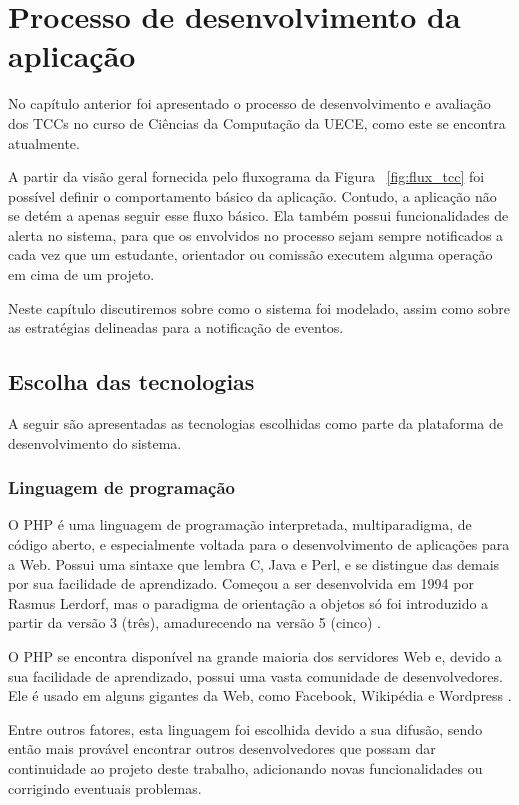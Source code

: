 \chapter{Processo de desenvolvimento da aplicação}
\label{cha:desenvolvimento}

No capítulo anterior foi apresentado o processo de desenvolvimento
e avaliação dos TCCs no curso de Ciências da Computação da UECE, como este se 
encontra atualmente. 

A partir da visão geral fornecida pelo fluxograma 
da Figura ~\ref{fig:flux_tcc} foi possível definir o comportamento básico 
da aplicação. Contudo, a aplicação não se 
detém a apenas seguir esse fluxo básico. Ela também possui funcionalidades
de alerta no sistema, para que os envolvidos no processo sejam sempre 
notificados a cada vez que um estudante, orientador ou comissão executem alguma
operação em cima de um projeto.

Neste capítulo discutiremos sobre como o sistema foi modelado, assim como sobre as
estratégias delineadas para a notificação de eventos.

\section{Escolha das tecnologias}
A seguir são apresentadas as tecnologias escolhidas como parte da plataforma de 
desenvolvimento do sistema.

\label{tecnologias}
\subsection{Linguagem de programação}
O PHP é uma linguagem de programação interpretada, multiparadigma, de código aberto, e especialmente
voltada para o desenvolvimento de aplicações para a Web. Possui uma sintaxe que lembra
C, Java e Perl, e se distingue das demais por sua facilidade de aprendizado.
Começou a ser desenvolvida em 1994 por Rasmus Lerdorf, mas o paradigma de orientação
a objetos só foi introduzido a partir da versão 3 (três), amadurecendo na versão 5 (cinco) \cite{PHP, Wiki:PHP}.

O PHP se encontra disponível na grande maioria dos servidores Web e, devido a sua 
facilidade de aprendizado, possui uma vasta comunidade de desenvolvedores. Ele é 
usado em alguns gigantes da Web, como Facebook, Wikipédia e Wordpress \cite{InfoQ:Facebook, Wikipedia:Arquitetura, Wordpress}.

Entre outros fatores, esta linguagem foi escolhida devido a sua difusão, sendo então mais
provável encontrar outros desenvolvedores que possam dar continuidade ao projeto deste trabalho,
adicionando novas funcionalidades ou corrigindo eventuais problemas.

